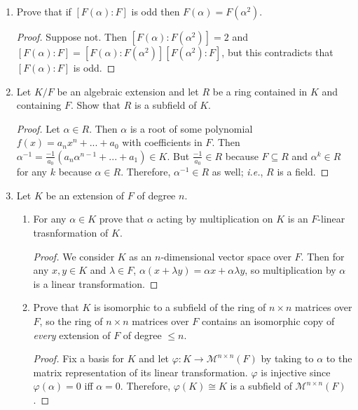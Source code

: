 \documentclass{report}
\begin{document}
\begin{enumerate}
	\item Prove that if $[F(\alpha):F]$ is odd then $F(\alpha)=F(\alpha^2)$.
		\begin{proof}
			Suppose not. Then $[F(\alpha):F(\alpha^2)]=2$ and $[F(\alpha):F]=[F(\alpha):F(\alpha^2)][F(\alpha^2):F]$, but this contradicts that $[F(\alpha):F]$ is odd.
		\end{proof}
		\setcounter{enumi}{15}
	\item Let $K / F$ be an algebraic extension and let $R$ be a ring contained in $K$ and containing $F$. Show that $R$ is a subfield of $K$.
		\begin{proof}
			Let $\alpha\in R$. Then $\alpha$ is a root of some polynomial $f(x)=a_nx^n+...+a_0$ with coefficients in $F$. 
			Then $\alpha^{-1}=\frac{-1}{a_0}(a_n\alpha^{n-1}+...+a_1)\in K$. But $\frac{-1}{a_0}\in R$ because $F\subseteq R$ and $\alpha^k\in R$ for any $k$ because $\alpha\in R$. 
			Therefore, $\alpha^{-1}\in R$ as well; \textit{i.e.}, $R$ is a field.
		\end{proof}
		\setcounter{enumi}{18}
	\item Let $K$ be an extension of $F$ of degree $n$.
		\begin{enumerate} [label=(\alph*)]
			\item For any $\alpha\in K$ prove that $\alpha$ acting by multiplication on $K$ is an $F$-linear trasnformation of $K$.
				\begin{proof}
					We consider $K$ as an $n$-dimensional vector space over $F$. Then for any $x,y\in K$ and $\lambda\in F$, $\alpha(x+\lambda y)=\alpha x +\alpha\lambda y$,
					so multiplication by $\alpha$ is a linear transformation.
				\end{proof}
			\item Prove that $K$ is isomorphic to a subfield of the ring of $n\times n$ matrices over $F$, so the ring of $n\times n$ matrices over $F$
				contains an isomorphic copy of \textit{every} extension of $F$ of degree $\leq n$.
				\begin{proof}
					Fix a basis for $K$ and let $\varphi:K\to \mathcal{M}^{n\times n}(F)$ by taking to $\alpha$ to the matrix representation of its linear transformation.
					$\varphi$ is injective since $\varphi(\alpha)=0$ iff $\alpha=0$. Therefore, $\varphi(K)\cong K$ is a subfield of $\mathcal{M}^{n\times n}(F)$.
				\end{proof}
		\end{enumerate}
\end{enumerate}
\end{document}
